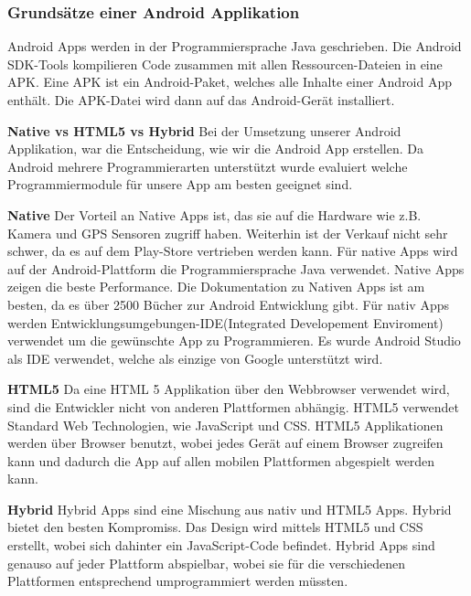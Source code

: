
\subsubsection{Grundsätze einer Android Applikation}
\label{subsec:aapp-fundam}

Android Apps werden in der Programmiersprache Java geschrieben.
Die Android SDK-Tools kompilieren Code zusammen mit allen Ressourcen-Dateien in eine APK.
Eine APK ist ein Android-Paket, welches alle Inhalte einer Android App enthält. 
Die APK-Datei wird dann auf das Android-Gerät installiert. 


\textbf{Native vs HTML5 vs Hybrid} \newline
Bei der Umsetzung unserer Android Applikation, war die Entscheidung, wie wir die Android App erstellen. 
Da Android mehrere Programmierarten unterstützt wurde evaluiert welche Programmiermodule für unsere App am besten geeignet sind. \nextline

\textbf{Native\newline} 
Der Vorteil an Native Apps ist, das sie auf die Hardware wie z.B. Kamera und GPS Sensoren zugriff haben. 
Weiterhin ist der Verkauf nicht sehr schwer, da es auf dem Play-Store vertrieben werden kann. 
Für native Apps wird auf der Android-Plattform die Programmiersprache Java verwendet.
Native Apps zeigen die beste Performance.
Die Dokumentation zu Nativen Apps ist am besten, da es über 2500 Bücher zur Android Entwicklung gibt.
Für nativ Apps werden Entwicklungsumgebungen-IDE(Integrated Developement Enviroment) verwendet um die gewünschte App zu Programmieren.
Es wurde Android Studio als IDE verwendet, welche als einzige von Google unterstützt wird.
\nextline


\textbf{HTML5\newline} 
Da eine HTML 5 Applikation über den Webbrowser verwendet wird, sind die Entwickler nicht von anderen Plattformen abhängig. 
HTML5 verwendet Standard Web Technologien, wie JavaScript und CSS.
HTML5 Applikationen werden über Browser benutzt, wobei jedes Gerät auf einem Browser zugreifen kann und dadurch die App auf allen mobilen Plattformen abgespielt werden kann. \nextline

\textbf{Hybrid\newline} 
Hybrid Apps sind eine Mischung aus nativ und HTML5 Apps. Hybrid bietet den besten Kompromiss. Das Design wird mittels HTML5 und CSS erstellt, wobei sich dahinter ein JavaScript-Code befindet. Hybrid Apps sind genauso auf jeder Plattform abspielbar, wobei sie für die verschiedenen Plattformen entsprechend umprogrammiert werden müssten. 
\cite{Faik.CH2-app-fundam_Vergleich} 
\clearpage

